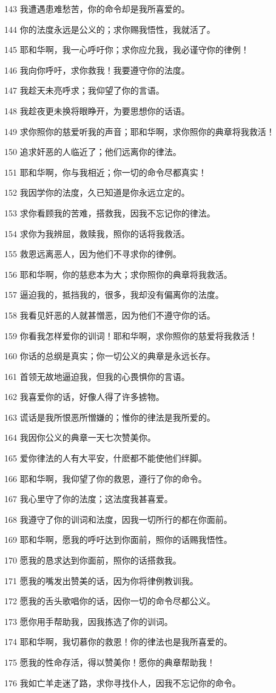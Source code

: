 \par 143 我遭遇患难愁苦，你的命令却是我所喜爱的。
\par 144 你的法度永远是公义的；求你赐我悟性，我就活了。
\par 145 耶和华啊，我一心呼吁你；求你应允我，我必谨守你的律例！
\par 146 我向你呼吁，求你救我！我要遵守你的法度。
\par 147 我趁天未亮呼求；我仰望了你的言语。
\par 148 我趁夜更未换将眼睁开，为要思想你的话语。
\par 149 求你照你的慈爱听我的声音；耶和华啊，求你照你的典章将我救活！
\par 150 追求奸恶的人临近了；他们远离你的律法。
\par 151 耶和华啊，你与我相近；你一切的命令尽都真实！
\par 152 我因学你的法度，久已知道是你永远立定的。
\par 153 求你看顾我的苦难，搭救我，因我不忘记你的律法。
\par 154 求你为我辨屈，救赎我，照你的话将我救活。
\par 155 救恩远离恶人，因为他们不寻求你的律例。
\par 156 耶和华啊，你的慈悲本为大；求你照你的典章将我救活。
\par 157 逼迫我的，抵挡我的，很多，我却没有偏离你的法度。
\par 158 我看见奸恶的人就甚憎恶，因为他们不遵守你的话。
\par 159 你看我怎样爱你的训词！耶和华啊，求你照你的慈爱将我救活！
\par 160 你话的总纲是真实；你一切公义的典章是永远长存。
\par 161 首领无故地逼迫我，但我的心畏惧你的言语。
\par 162 我喜爱你的话，好像人得了许多掳物。
\par 163 谎话是我所恨恶所憎嫌的；惟你的律法是我所爱的。
\par 164 我因你公义的典章一天七次赞美你。
\par 165 爱你律法的人有大平安，什麽都不能使他们绊脚。
\par 166 耶和华啊，我仰望了你的救恩，遵行了你的命令。
\par 167 我心里守了你的法度；这法度我甚喜爱。
\par 168 我遵守了你的训词和法度，因我一切所行的都在你面前。
\par 169 耶和华啊，愿我的呼吁达到你面前，照你的话赐我悟性。
\par 170 愿我的恳求达到你面前，照你的话搭救我。
\par 171 愿我的嘴发出赞美的话，因为你将律例教训我。
\par 172 愿我的舌头歌唱你的话，因你一切的命令尽都公义。
\par 173 愿你用手帮助我，因我拣选了你的训词。
\par 174 耶和华啊，我切慕你的救恩！你的律法也是我所喜爱的。
\par 175 愿我的性命存活，得以赞美你！愿你的典章帮助我！
\par 176 我如亡羊走迷了路，求你寻找仆人，因我不忘记你的命令。

